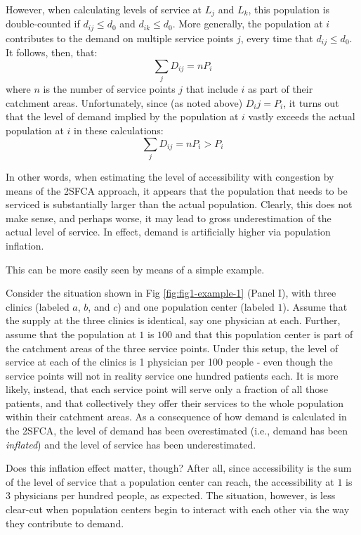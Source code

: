 \documentclass[10pt,letterpaper]{article}
\begin{document}
However, when calculating levels of service at \(L_j\) and \(L_k\), this
population is double-counted if \(d_{ij} \le d_0\) and
\(d_{ik} \leq d_0\). More generally, the population at \(i\) contributes
to the demand on multiple service points \(j\), every time that
\(d_{ij} \le d_0\). It follows, then, that: \[
\sum_j D_{ij} = nP_i
\] where \(n\) is the number of service points \(j\) that include \(i\)
as part of their catchment areas. Unfortunately, since (as noted above)
\(D_ij = P_i\), it turns out that the level of demand implied by the
population at \(i\) vastly exceeds the actual population at \(i\) in
these calculations: \[
\sum_j D_{ij} = nP_i > P_i
\]

In other words, when estimating the level of accessibility with
congestion by means of the 2SFCA approach, it appears that the
population that needs to be serviced is substantially larger than the
actual population. Clearly, this does not make sense, and perhaps worse,
it may lead to gross underestimation of the actual level of service. In
effect, demand is artificially higher via population inflation.

This can be more easily seen by means of a simple example.

Consider the situation shown in Fig \ref{fig:fig1-example-1} (Panel I),
with three clinics (labeled \(a\), \(b\), and \(c\)) and one population
center (labeled \(1\)). Assume that the supply at the three clinics is
identical, say one physician at each. Further, assume that the
population at \(1\) is \(100\) and that this population center is part
of the catchment areas of the three service points. Under this setup,
the level of service at each of the clinics is 1 physician per 100
people - even though the service points will not in reality service one
hundred patients each. It is more likely, instead, that each service
point will serve only a fraction of all those patients, and that
collectively they offer their services to the whole population within
their catchment areas. As a consequence of how demand is calculated in
the 2SFCA, the level of demand has been overestimated (i.e., demand has
been \emph{inflated}) and the level of service has been underestimated.

Does this inflation effect matter, though? After all, since
accessibility is the sum of the level of service that a population
center can reach, the accessibility at \(1\) is 3 physicians per hundred
people, as expected. The situation, however, is less clear-cut when
population centers begin to interact with each other via the way they
contribute to demand.
\end{document}
